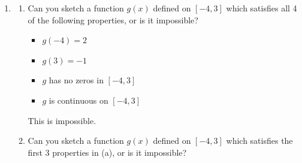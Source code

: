 \documentclass[main]{subfiles}
\providecommand{\note}[1]{}
\begin{document}
\begin{enumerate}[resume]
\begin{enumerate}
    \begin{solution}
      False; for example, in \ref{continuous-differentiable-1}, $f(x)$ is continuous at $x = -3$, but it is not differentiable at $x = -3$. Any place where $f(x)$ has a ``corner'' is a counterexample.
    \end{solution}

  \item

    \note{If students want some explanation of why this is true, I will give them some intuition: if $f(x)$ is differentiable at $x = a$, then we've seen that, as we zoom in on the graph of $f$ around $x = a$, it looks more and more like the tangent line. And of course, the tangent line is continuous.}

    \begin{problem}[1in]
      If $f(x)$ is differentiable at $x = a$, then $f(x)$ is continuous
      at $x = a$.
    \end{problem}

    \begin{solution}
      This is true.
    \end{solution}

  \end{enumerate}

\item 
  \begin{enumerate}
  \item

    \note{This is basically the idea of the Intermediate Value Theorem, but there's no need to mention the IVT.}

    \begin{problem}[\vfill]
      Can you sketch a function $g(x)$ defined on $[-4, 3]$ which satisfies all 4 of the following properties, or is it impossible?
      \begin{itemize}[nosep]
      \item $g(-4) = 2$
      \item $g(3) = -1$
      \item $g$ has no zeros in $[-4, 3]$
      \item $g$ is continuous on $[-4, 3]$
      \end{itemize}
    \end{problem}

    \begin{solution}
      This is impossible. 
    \end{solution}

  \item
    \begin{problem}[\vfill\newpage]
      Can you sketch a function $g(x)$ defined on $[-4, 3]$ which satisfies the first 3 properties in (a), or is it impossible?
    \end{problem}


\end{enumerate}
\end{enumerate}
\end{document}
